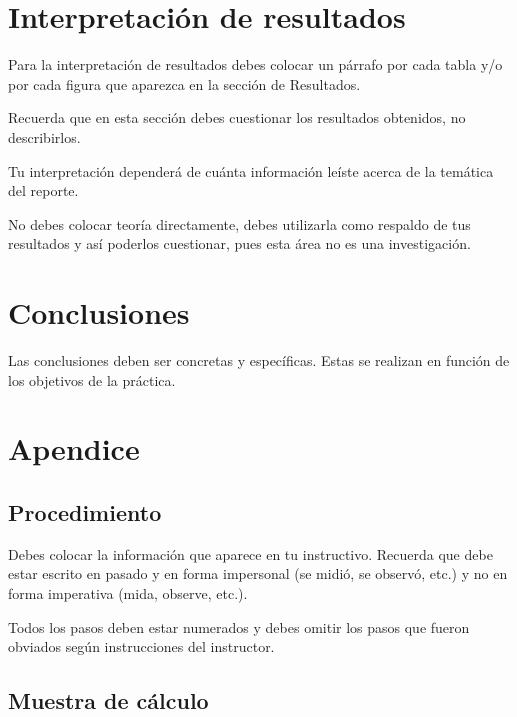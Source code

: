 \documentclass[osajnl,onecolumn,showpacs,superscriptaddress,12pt]{revtex4-1}
\begin{document}
\section{Interpretación de resultados}


Para la interpretación de resultados debes colocar un párrafo por cada tabla y/o por cada figura que aparezca en la sección de Resultados.\

Recuerda que en esta sección debes cuestionar los resultados obtenidos, no describirlos.\

Tu interpretación dependerá de cuánta información leíste acerca de la temática del reporte.\

No debes colocar teoría directamente, debes utilizarla como respaldo de tus resultados y así poderlos cuestionar, pues esta área no es una investigación.


\section{Conclusiones}

Las conclusiones deben ser concretas y específicas. Estas se realizan en función de los objetivos de la práctica.


\section{Apendice}

\subsection{Procedimiento}

Debes colocar la información que aparece en tu instructivo. Recuerda que debe estar escrito en pasado y en forma impersonal (se midió, se observó, etc.) y no en forma imperativa (mida, observe, etc.).\

Todos los pasos deben estar numerados y debes omitir los pasos que fueron obviados según
instrucciones del instructor.



\subsection{Muestra de cálculo}
\end{document}
